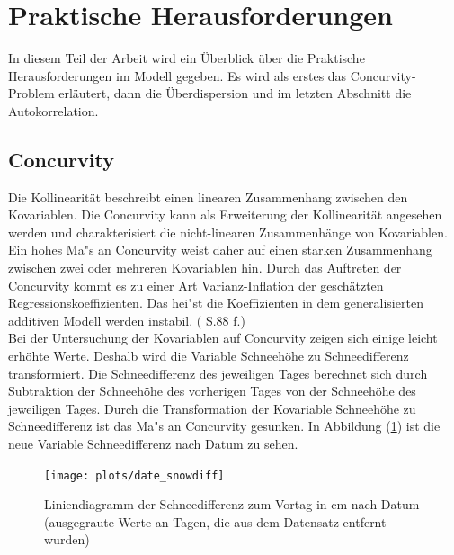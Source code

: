 \documentclass[12pt]{scrreprt}
\begin{document}
\section{Praktische Herausforderungen}
In diesem Teil der Arbeit wird ein Überblick über die Praktische Herausforderungen im Modell gegeben. Es wird als erstes das Concurvity-Problem erläutert, dann die Überdispersion und im letzten Abschnitt die Autokorrelation.

\subsection{Concurvity}
\label{chap:Concurvity}
Die Kollinearität beschreibt einen linearen Zusammenhang zwischen den Kovariablen. Die Concurvity kann als Erweiterung der Kollinearität angesehen werden und charakterisiert die nicht-linearen Zusammenhänge von Kovariablen. Ein hohes Ma"s an Concurvity weist daher auf einen starken Zusammenhang zwischen zwei oder mehreren Kovariablen hin. Durch das Auftreten der Concurvity kommt es zu einer Art Varianz-Inflation der geschätzten Regressionskoeffizienten. Das hei"st die Koeffizienten in dem generalisierten additiven Modell werden instabil. (\cite{amodio2014concurvity} S.88 f.) \\
Bei der Untersuchung der Kovariablen auf Concurvity zeigen sich einige leicht erhöhte Werte. Deshalb wird die Variable Schneehöhe zu Schneedifferenz transformiert. Die Schneedifferenz des jeweiligen Tages berechnet sich durch Subtraktion der Schneehöhe des vorherigen Tages von der Schneehöhe des jeweiligen Tages. Durch die Transformation der Kovariable Schneehöhe zu Schneedifferenz ist das Ma"s an Concurvity gesunken. In Abbildung (\ref{pic:date_snowdiff}) ist die neue Variable Schneedifferenz nach Datum zu sehen.

\begin{figure}[H]
	\centering
	\texttt{[image: plots/date\_snowdiff]}
	\caption{Liniendiagramm der Schneedifferenz zum Vortag in cm nach Datum (ausgegraute Werte an Tagen, die aus dem Datensatz entfernt wurden)}
	\label{pic:date_snowdiff}	
\end{figure}
\end{document}
